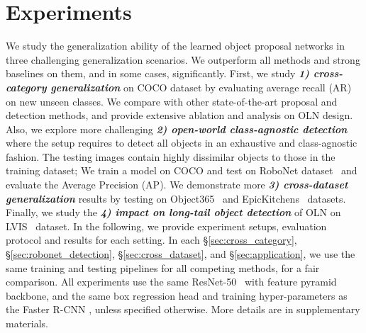 \documentclass[10pt,twocolumn,letterpaper]{article}
\newcommand{\secref}[1]{§\ref{#1}}
\begin{document}
\section{Experiments}
We study the generalization ability of the learned object proposal networks in three challenging generalization scenarios. We outperform all methods and strong baselines on them, and in some cases, significantly. First, we study \textit{\textbf{1) cross-category generalization}} on COCO dataset by evaluating average recall (AR) on new unseen classes. We compare with other state-of-the-art proposal and detection methods, and provide extensive ablation and analysis on OLN design. Also, we explore more challenging \textit{\textbf{2) open-world class-agnostic detection}} where the setup requires to detect all objects in an exhaustive and class-agnostic fashion. The testing images contain highly dissimilar objects to those in the training dataset; We train a model on COCO and test on RoboNet dataset~\cite{dasari2019robonet} and evaluate the Average Precision (AP). We demonstrate more \textit{\textbf{3) cross-dataset generalization}} results by testing on Object365~\cite{shao2019objects365} and EpicKitchens~\cite{Damen2020Collection} datasets. Finally, we study the \textit{\textbf{4) impact on long-tail object detection}} of OLN on LVIS~\cite{gupta2019lvis} dataset. In the following, we provide experiment setups, evaluation protocol and results for each setting. In each \secref{sec:cross_category}, \secref{sec:robonet_detection}, \secref{sec:cross_dataset}, and \secref{sec:application}, we use the same training and testing pipelines for all competing methods, for a fair comparison. All experiments use the same ResNet-50~\cite{he2016deep} with feature pyramid~\cite{lin2017feature} backbone, and the same box regression head and training hyper-parameters as the Faster R-CNN \cite{fasterNIPS2015}, unless specified otherwise. More details are in supplementary materials.
\end{document}
